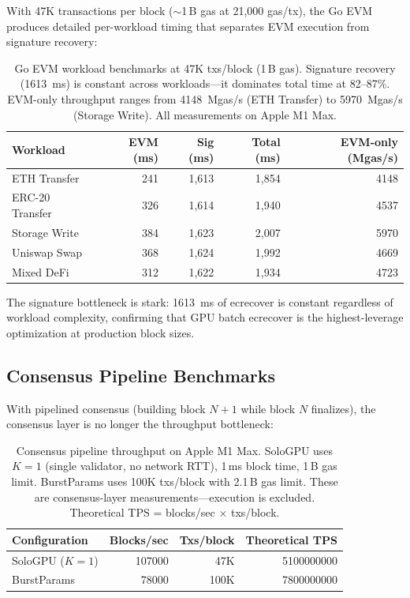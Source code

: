 With 47K transactions per block ($\sim$1\,B gas at 21{,}000 gas/tx), the Go EVM
produces detailed per-workload timing that separates EVM execution from signature
recovery:

\begin{table}[h]
\centering
\small
\begin{tabular}{lrrrr}
\toprule
\textbf{Workload} & \textbf{EVM (ms)} & \textbf{Sig (ms)} & \textbf{Total (ms)} & \textbf{EVM-only (Mgas/s)} \\
\midrule
ETH Transfer    & 241  & 1{,}613 & 1{,}854 & \num{4148} \\
ERC-20 Transfer & 326  & 1{,}614 & 1{,}940 & \num{4537} \\
Storage Write   & 384  & 1{,}623 & 2{,}007 & \num{5970} \\
Uniswap Swap    & 368  & 1{,}624 & 1{,}992 & \num{4669} \\
Mixed DeFi      & 312  & 1{,}622 & 1{,}934 & \num{4723} \\
\bottomrule
\end{tabular}
\caption{Go EVM workload benchmarks at 47K txs/block (1\,B gas). Signature recovery
(\SI{1613}{ms}) is constant across workloads---it dominates total time at 82--87\%.
EVM-only throughput ranges from \SI{4148}{Mgas/s} (ETH Transfer) to \SI{5970}{Mgas/s}
(Storage Write). All measurements on Apple M1 Max.}
\label{tab:workload}
\end{table}

The signature bottleneck is stark: \SI{1613}{ms} of ecrecover is constant regardless of
workload complexity, confirming that GPU batch ecrecover is the highest-leverage
optimization at production block sizes.

\subsection{Consensus Pipeline Benchmarks}

With pipelined consensus (building block $N{+}1$ while block $N$ finalizes), the
consensus layer is no longer the throughput bottleneck:

\begin{table}[h]
\centering
\small
\begin{tabular}{lrrr}
\toprule
\textbf{Configuration} & \textbf{Blocks/sec} & \textbf{Txs/block} & \textbf{Theoretical TPS} \\
\midrule
SoloGPU ($K{=}1$)  & \num{107000} & 47K  & \num{5100000000} \\
BurstParams         & \num{78000}  & 100K & \num{7800000000} \\
\bottomrule
\end{tabular}
\caption{Consensus pipeline throughput on Apple M1 Max. SoloGPU uses $K{=}1$
(single validator, no network RTT), 1\,ms block time, 1\,B gas limit.
BurstParams uses 100K txs/block with 2.1\,B gas limit. These are consensus-layer
measurements---execution is excluded. Theoretical TPS = blocks/sec $\times$ txs/block.}
\label{tab:consensus_pipeline}
\end{table}

